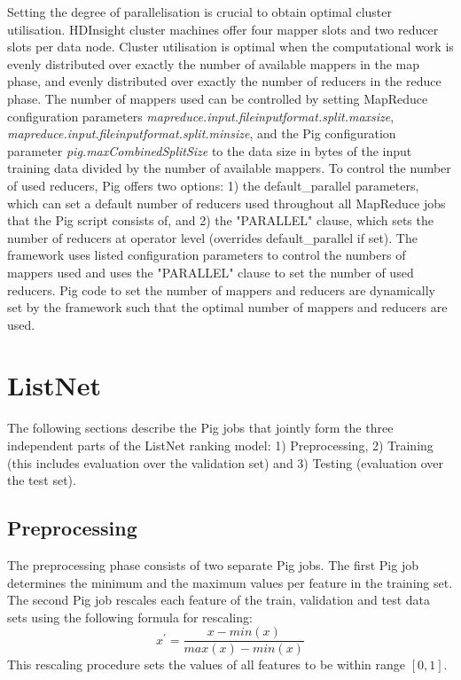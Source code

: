 \begin{sloppypar}
Setting the degree of parallelisation is crucial to obtain optimal cluster utilisation. HDInsight cluster machines offer four mapper slots and two reducer slots per data node. Cluster utilisation is optimal when the computational work is evenly distributed over exactly the number of available mappers in the map phase, and evenly distributed over exactly the number of reducers in the reduce phase. The number of mappers used can be controlled by setting MapReduce configuration parameters \emph{mapreduce.input.fileinputformat.split.maxsize}, \emph{mapreduce.input.fileinputformat.split.minsize}, and the Pig configuration parameter \emph{pig.maxCombinedSplitSize} to the data size in bytes of the input training data divided by the number of available mappers. To control the number of used reducers, Pig offers two options: 1) the default\_parallel parameters, which can set a default number of reducers used throughout all MapReduce jobs that the Pig script consists of, and 2) the "PARALLEL" clause, which sets the number of reducers at operator level (overrides default\_parallel if set). The framework uses listed configuration parameters to control the numbers of mappers used and uses the "PARALLEL" clause to set the number of used reducers. Pig code to set the number of mappers and reducers are dynamically set by the framework such that the optimal number of mappers and reducers are used.
\end{sloppypar}

\section{ListNet}
The following sections describe the Pig jobs that jointly form the three independent parts of the ListNet ranking model: 1) Preprocessing, 2) Training (this includes evaluation over the validation set) and 3) Testing (evaluation over the test set). 
\subsection{Preprocessing}
\label{ssec:preprocessing}
The preprocessing phase consists of two separate Pig jobs. The first Pig job determines the minimum and the maximum values per feature in the training set. The second Pig job rescales each feature of the train, validation and test data sets using the following formula for rescaling:
\begin{equation}
x^{'} = \frac{x-min(x)}{max(x)-min(x)}
\label{eq:rescaling}
\end{equation}
This rescaling procedure sets the values of all features to be within range $[0,1]$.\\

